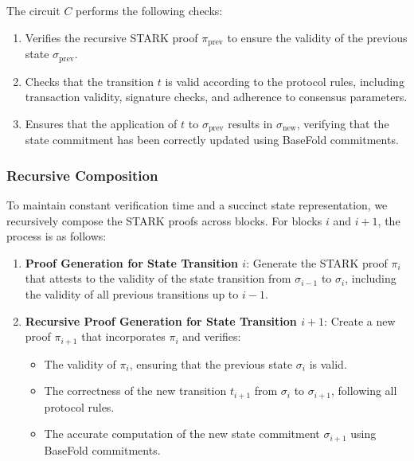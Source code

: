 \documentclass{article}
\theoremstyle{plain}
\theoremstyle{definition}
\theoremstyle{remark}
\theoremstyle{problem}
\begin{document}
The circuit $C$ performs the following checks:

\begin{enumerate}
    \item Verifies the recursive STARK proof $\pi_{\text{prev}}$ to ensure the validity of the previous state $\sigma_{\text{prev}}$.

    \item Checks that the transition $t$ is valid according to the protocol rules, including transaction validity, signature checks, and adherence to consensus parameters.

    \item Ensures that the application of $t$ to $\sigma_{\text{prev}}$ results in $\sigma_{\text{new}}$, verifying that the state commitment has been correctly updated using BaseFold commitments.
\end{enumerate}

\subsubsection{Recursive Composition}

To maintain constant verification time and a succinct state representation, we recursively compose the STARK proofs across blocks. For blocks $i$ and $i+1$, the process is as follows:

\begin{enumerate}
    \item \textbf{Proof Generation for State Transition $i$}: Generate the STARK proof $\pi_i$ that attests to the validity of the state transition from $\sigma_{i-1}$ to $\sigma_i$, including the validity of all previous transitions up to $i-1$.

    \item \textbf{Recursive Proof Generation for State Transition $i+1$}: Create a new proof $\pi_{i+1}$ that incorporates $\pi_i$ and verifies:

    \begin{itemize}
        \item The validity of $\pi_i$, ensuring that the previous state $\sigma_i$ is valid.

        \item The correctness of the new transition $t_{i+1}$ from $\sigma_i$ to $\sigma_{i+1}$, following all protocol rules.

        \item The accurate computation of the new state commitment $\sigma_{i+1}$ using BaseFold commitments.
    \end{itemize}
\end{enumerate}
\end{document}
